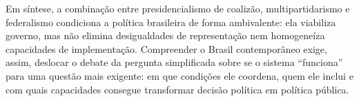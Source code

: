 \documentclass[12pt,a4paper]{article}
\begin{document}
Em síntese, a combinação entre presidencialismo de coalizão, multipartidarismo e federalismo condiciona a política brasileira de forma ambivalente: ela viabiliza governo, mas não elimina desigualdades de representação nem homogeneíza capacidades de implementação. Compreender o Brasil contemporâneo exige, assim, deslocar o debate da pergunta simplificada sobre se o sistema “funciona” para uma questão mais exigente: em que condições ele coordena, quem ele inclui e com quais capacidades consegue transformar decisão política em política pública.

\printbibliography
\end{document}
